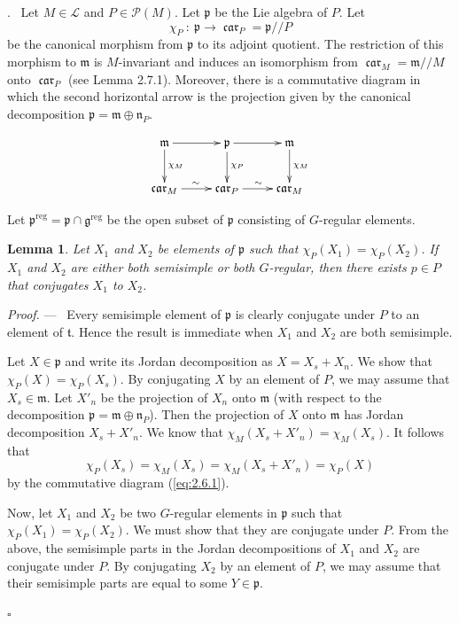 \documentclass[12pt,a4paper,oneside,english,leqno]{smfart}
\makeatletter
\numberwithin{equation}{subsection}
\newcounter{theo}
\numberwithin{theo}{subsection}
\newenvironment{paragr}[1][]{\medskip\refstepcounter{subsection}%
  \par\noindent\hspace*{\parindent}\thesubsection.\ \emph{#1}%
  \@ifundefined{@empty}{}{}\ignorespaces}{\medskip}
\theoremstyle{plain}
\newtheorem{lemme}[theo]{Lemma}
\theoremstyle{definition}
\theoremstyle{remark}
\newenvironment{preuve}[1][]{\medskip\noindent\textit{Proof.} #1 ---\ }%
  {\hfill\ensuremath{\square}\medskip}
\DeclareMathOperator{\reg}{reg}
\DeclareMathOperator{\car}{\mathfrak{car}}
\newcommand{\lc}{\mathcal{L}}
\newcommand{\pc}{\mathcal{P}}
\newcommand{\ggo}{\mathfrak{g}}
\newcommand{\mgo}{\mathfrak{m}}
\newcommand{\ngo}{\mathfrak{n}}
\newcommand{\pgo}{\mathfrak{p}}
\newcommand{\tgo}{\mathfrak{t}}
\makeatother
\begin{document}
\begin{paragr}\label{S:2.6}
Let $M\in \lc$ and $P\in \pc(M)$. Let $\pgo$ be the Lie algebra of $P$. Let
   $$\chi_P \ :\ \pgo \to \car_P=\pgo//P$$
be the canonical morphism from $\pgo$ to its adjoint quotient. The restriction of this morphism to $\mgo$ is $M$-invariant and induces an isomorphism from $\car_M=\mgo //M$ onto $\car_P$ (see \cite{LFPI} Lemma 2.7.1). Moreover, there is a commutative diagram in which the second horizontal arrow is the projection given by the canonical decomposition $\pgo=\mgo\oplus \ngo_P$.

 \begin{equation}\label{eq:2.6.1}
    \xymatrix{ \mgo \ar[r]  \ar[d]^{\chi_M} & \pgo \ar[r]  \ar[d]^{\chi_P} & \mgo \ar[d]^{\chi_M}  \\
 \car_M \ar[r]^{\sim} &\car_P\ar[r]^{\sim} & \car_M }
\end{equation}

Let $\pgo^{\reg}=\pgo\cap \ggo^{\reg}$ be the open subset of $\pgo$ consisting of $G$-regular elements.

\begin{lemme}\label{thm:2.6.1} Let $X_1$ and $X_2$ be elements of $\pgo$ such that $\chi_P(X_1)=\chi_P(X_2)$. If $X_1$ and $X_2$ are either both semisimple or both $G$-regular, then there exists $p\in P$ that conjugates $X_1$ to $X_2$.
\end{lemme}

\begin{preuve}
Every semisimple element of $\pgo$ is clearly conjugate under $P$ to an element of $\tgo$. Hence the result is immediate when $X_1$ and $X_2$ are both semisimple.

Let $X\in \pgo$ and write its Jordan decomposition as $X=X_s+X_n$. We show that $\chi_P(X)=\chi_P(X_s)$. By conjugating $X$ by an element of $P$, we may assume that $X_s\in \mgo$. Let $X'_n$ be the projection of $X_n$ onto $\mgo$ (with respect to the decomposition $\pgo=\mgo\oplus\ngo_P$). Then the projection of $X$ onto $\mgo$ has Jordan decomposition $X_s+X'_n$. We know that $\chi_M(X_s+X'_n)=\chi_M(X_s)$. It follows that
$$\chi_P(X_s)=\chi_M(X_s)=\chi_M(X_s+X'_n)=\chi_P(X)$$
by the commutative diagram (\ref{eq:2.6.1}).

Now, let $X_1$ and $X_2$ be two $G$-regular elements in $\pgo$ such that $\chi_P(X_1)=\chi_P(X_2)$. We must show that they are conjugate under $P$. From the above, the semisimple parts in the Jordan decompositions of $X_1$ and $X_2$ are conjugate under $P$. By conjugating $X_2$ by an element of $P$, we may assume that their semisimple parts are equal to some $Y\in \pgo$.


\end{preuve}
\end{paragr}
\end{document}
